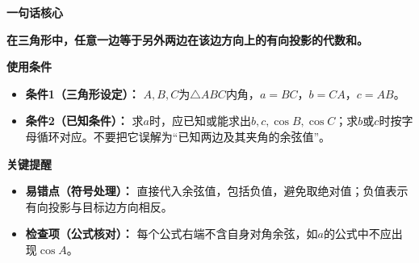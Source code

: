 \begin{summarybox}
	\textbf{\textcolor{CSummary}{一句话核心}}

	\textbf{在三角形中，任意一边等于另外两边在该边方向上的有向投影的代数和。}

	\medskip
	\textbf{\textcolor{CSummary}{使用条件}}
	\begin{itemize}[leftmargin=*, itemsep=0.5em, topsep=0.4em]
		\item \textbf{条件1（三角形设定）：} $A,B,C$为$\triangle ABC$内角，$a=BC$，$b=CA$，$c=AB$。
		\item \textbf{条件2（已知条件）：} 求$a$时，应已知或能求出$b,c,\cos B,\cos C$；求$b$或$c$时按字母循环对应。不要把它误解为“已知两边及其夹角的余弦值”。
	\end{itemize}

	\medskip
	\textbf{\textcolor{CSummary}{关键提醒}}
	\begin{itemize}[leftmargin=*, itemsep=0.5em, topsep=0.4em]
		\item \textbf{易错点（符号处理）：} 直接代入余弦值，包括负值，避免取绝对值；负值表示有向投影与目标边方向相反。
		\item \textbf{检查项（公式核对）：} 每个公式右端不含自身对角余弦，如$a$的公式中不应出现$\cos A$。
	\end{itemize}
\end{summarybox}